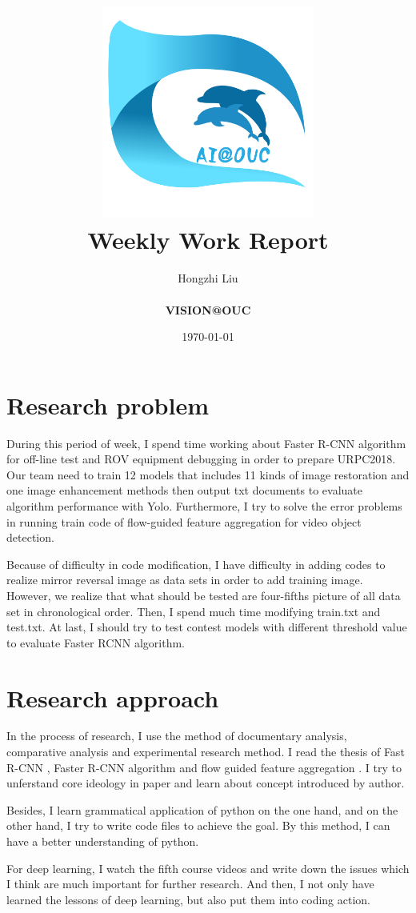 \documentclass[a4paper]{article}
\title{
	\vspace*{1in}
	\includegraphics[width=2.75in]{figures/zhenglab-logo} \\
	\vspace*{1.2in}
	\textbf{\huge Weekly Work Report}
	\vspace{0.2in}
}
\author{Hongzhi Liu \\
	\vspace*{0.5in} \\
	\textbf{VISION@OUC} \\
	\vspace*{1in}
}
\date{\today}
\begin{document}
	\par
	\maketitle
	\setcounter{page}{0}
	\thispagestyle{empty}
	
	\newpage
	
	\section{Research problem}
	
	During this period of week, I spend time working about Faster R-CNN algorithm for off-line test and ROV equipment debugging in order to prepare URPC2018. Our team need to train 12 models that includes 11 kinds of image restoration and one image enhancement methods then output txt documents to evaluate algorithm performance with Yolo. Furthermore, I try to solve the error problems in running train code of flow-guided feature aggregation for video object detection.
	
	Because of difficulty in code modification, I have difficulty in adding codes to realize mirror reversal image as data sets in order to add training image. However, we realize that what should be tested are four-fifths picture of all data set in chronological order. Then, I spend much time modifying train.txt and test.txt. At last, I should try to test contest models with different threshold value to evaluate Faster RCNN algorithm. 
	
	\section{Research approach}
	
	In the process of research, I use the method of documentary analysis, comparative analysis and experimental research method. I read the thesis of Fast R-CNN \cite{Girshick2015Fast}, Faster R-CNN algorithm \cite{Ren2015Faster} and flow guided feature aggregation \cite{zhu17fgfa}. I try to unferstand core ideology in paper and learn about concept introduced by author.
	
	Besides, I learn grammatical application of python on the one hand, and on the other hand, I try to write code files to achieve the goal. By this method, I can have a better understanding of python.
	
	For deep learning, I watch the fifth course videos and write down the issues which I think are much important for further research. And then, I not only have learned the lessons of deep learning, but also put them into coding action. 
	
\end{document}
